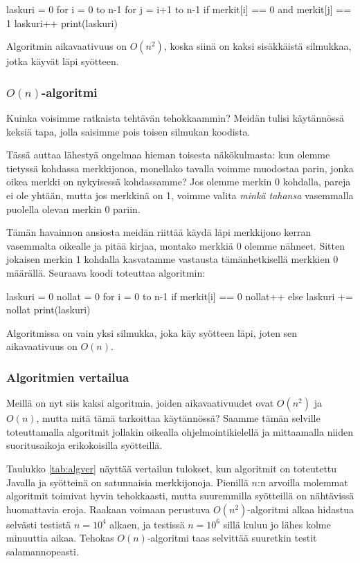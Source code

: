 \begin{code}
laskuri = 0
for i = 0 to n-1
    for j = i+1 to n-1
        if merkit[i] == 0 and merkit[j] == 1
            laskuri++
print(laskuri)
\end{code}

Algoritmin aikavaativuus on $O(n^2)$, koska siinä on kaksi
sisäkkäistä silmukkaa, jotka käyvät läpi syötteen.

\subsubsection{$O(n)$-algoritmi}

Kuinka voisimme ratkaista tehtävän tehokkaammin?
Meidän tulisi käytän\-nössä keksiä tapa, jolla saisimme
pois toisen silmukan koodista.

Tässä auttaa lähestyä ongelmaa hieman toisesta
näkökulmasta: kun olemme tietyssä kohdassa merkkijonoa,
monellako tavalla voimme muodostaa parin,
jonka oikea merkki on nykyisessä kohdassamme?
Jos olemme merkin 0 kohdalla, pareja ei ole yhtään,
mutta jos merkkinä on 1, voimme valita \emph{minkä tahansa}
vasemmalla puolella olevan merkin 0 pariin.

Tämän havainnon ansiosta meidän riittää käydä läpi
merkkijono kerran vasemmalta oikealle ja pitää kirjaa,
montako merkkiä 0 olemme nähneet.
Sitten jokaisen merkin 1 kohdalla kasvatamme
vastausta tämänhetkisellä merkkien 0 määrällä.
Seuraava koodi toteuttaa algoritmin:

\begin{code}
laskuri = 0
nollat = 0
for i = 0 to n-1
    if merkit[i] == 0
        nollat++
    else
        laskuri += nollat
print(laskuri)
\end{code}

Algoritmissa on vain yksi silmukka, joka käy syötteen läpi,
joten sen aikavaativuus on $O(n)$.

\subsubsection{Algoritmien vertailua}

Meillä on nyt siis kaksi algoritmia, joiden aikavaativuudet ovat
$O(n^2)$ ja $O(n)$, mutta mitä tämä tarkoittaa käytännössä?
Saamme tämän selville toteuttamalla algoritmit jollakin
oikealla ohjelmointikielellä
ja mittaamalla niiden suoritusaikoja erikokoisilla syötteillä.

Taulukko \ref{tab:algver} näyttää vertailun tulokset,
kun algoritmit on toteutettu Javalla ja syötteinä
on satunnaisia merkkijonoja.
Pienillä $n$:n arvoilla molemmat algoritmit toimivat
hyvin tehokkaasti, mutta suuremmilla syötteillä on
nähtävissä huomattavia eroja.
Raakaan voimaan perustuva $O(n^2)$-algoritmi
alkaa hidastua selvästi testistä $n=10^4$ alkaen,
ja testissä $n=10^6$ sillä kuluu jo lähes kolme minuuttia aikaa.
Tehokas $O(n)$-algoritmi taas selvittää suuretkin testit
salamannopeasti.

